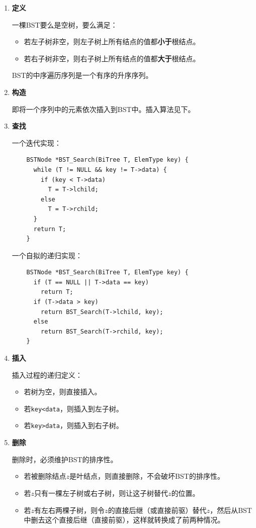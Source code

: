 \documentclass[12pt, a4paper, oneside]{ctexart}
\begin{document}
\begin{enumerate}
  \item {\bf 定义}
  
  一棵BST要么是空树，要么满足：
  \begin{itemize}
    \item 若左子树非空，则左子树上所有结点的值都\textbf{小于}根结点。
    \item 若右子树非空，则右子树上所有结点的值都\textbf{大于}根结点。
  \end{itemize}
  
  BST的中序遍历序列是一个有序的升序序列。

  \item {\bf 构造}
  
  即将一个序列中的元素依次插入到BST中。插入算法见下。

  \item {\bf 查找}
  
  一个迭代实现：
  \begin{lstlisting}
    BSTNode *BST_Search(BiTree T, ElemType key) {
      while (T != NULL && key != T->data) {
        if (key < T->data)
          T = T->lchild;
        else
          T = T->rchild;
      }
      return T;
    }
  \end{lstlisting}

  一个自拟的递归实现：
  \begin{lstlisting}
    BSTNode *BST_Search(BiTree T, ElemType key) {
      if (T == NULL || T->data == key)
        return T;
      if (T->data > key)
        return BST_Search(T->lchild, key);
      else
        return BST_Search(T->rchild, key);
    }
  \end{lstlisting}

  \item {\bf 插入}
  
  插入过程的递归定义：
  \begin{itemize}
    \item 若树为空，则直接插入。
    \item 若\verb|key<data|，则插入到左子树。
    \item 若\verb|key>data|，则插入到右子树。
  \end{itemize}

  \item {\bf 删除}
  
  删除时，必须维护BST的排序性。
  \begin{itemize}
    \item 若被删除结点$z$是叶结点，则直接删除，不会破坏BST的排序性。
    \item 若$z$只有一棵左子树或右子树，则让这子树替代$z$的位置。
    \item 若$z$有左右两棵子树，则令$z$的直接后继（或直接前驱）替代$z$，然后从BST中删去这个直接后继（直接前驱），这样就转换成了前两种情况。
  \end{itemize}
\end{enumerate}
\end{document}
